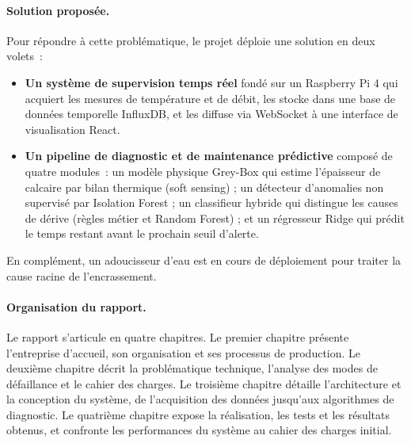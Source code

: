 \paragraph{Solution proposée.}
Pour répondre à cette problématique, le projet déploie une solution en deux volets~:
\begin{itemize}
\item \textbf{Un système de supervision temps réel} fondé sur un Raspberry Pi 4 qui acquiert les mesures de température et de débit, les stocke dans une base de données temporelle InfluxDB, et les diffuse via WebSocket à une interface de visualisation React.
\item \textbf{Un pipeline de diagnostic et de maintenance prédictive} composé de quatre modules~: un modèle physique Grey-Box qui estime l'épaisseur de calcaire par bilan thermique (soft sensing) ; un détecteur d'anomalies non supervisé par Isolation Forest ; un classifieur hybride qui distingue les causes de dérive (règles métier et Random Forest) ; et un régresseur Ridge qui prédit le temps restant avant le prochain seuil d'alerte.
\end{itemize}
En complément, un adoucisseur d'eau est en cours de déploiement pour traiter la cause racine de l'encrassement.

\paragraph{Organisation du rapport.}
Le rapport s'articule en quatre chapitres. Le premier chapitre présente l'entreprise d'accueil, son organisation et ses processus de production. Le deuxième chapitre décrit la problématique technique, l'analyse des modes de défaillance et le cahier des charges. Le troisième chapitre détaille l'architecture et la conception du système, de l'acquisition des données jusqu'aux algorithmes de diagnostic. Le quatrième chapitre expose la réalisation, les tests et les résultats obtenus, et confronte les performances du système au cahier des charges initial.
